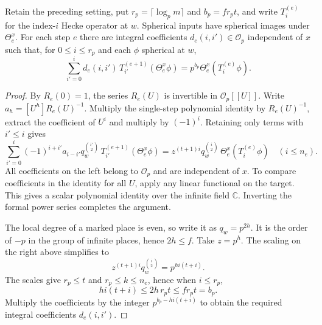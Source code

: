 \begin{lemma}
\label{lem:a-marked-hecke-one-step-cost}
\emitthmsource
Retain the preceding setting, put $r_p=\lceil\log_p m\rceil$ and $b_p=fr_pt$, and write $T_i^{(e)}$ for the index-$i$ Hecke operator at $w$. Spherical inputs have spherical images under $\Theta_e^x$. For each step $e$ there are integral coefficients $d_e(i,i')\in\mathcal O_p$ independent of $x$ such that, for $0\le i\le r_p$ and each $\phi$ spherical at $w$,
\[
 \sum_{i'=0}^{i}d_e(i,i')\,T_{i'}^{(e+1)}(\Theta_e^x\phi)
      =p^{b_p}\Theta_e^x(T_i^{(e)}\phi).
\]
\end{lemma}
\begin{proof}
By $R_e(0)=1$, the series $R_e(U)$ is invertible in $\mathcal O_p[[U]]$. Write $a_h=[U^h]R_e(U)^{-1}$. Multiply the single-step polynomial identity by $R_e(U)^{-1}$, extract the coefficient of $U^i$ and multiply by $(-1)^i$. Retaining only terms with $i'\le i$ gives
\[
 \sum_{i'=0}^{i}
    (-1)^{i+i'}a_{i-i'}q_w^{\binom{i'}2}\,T_{i'}^{(e+1)}(\Theta_e^x\phi)
  =z^{(t+1)i}q_w^{\binom i2}\,\Theta_e^x(T_i^{(e)}\phi)
 \quad (i\le n_e).
\]
All coefficients on the left belong to $\mathcal O_p$ and are independent of $x$. To compare coefficients in the identity for all $U$, apply any linear functional on the target. This gives a scalar polynomial identity over the infinite field $\mathbb C$. Inverting the formal power series completes the argument.

The local degree of a marked place is even, so write it as $q_w=p^{2h}$. It is the order of $-p$ in the group of infinite places, hence $2h\le f$. Take $z=p^h$. The scaling on the right above simplifies to
\[
 z^{(t+1)i}q_w^{\binom i2}
  =p^{h i(t+i)}.
\]
The scales give $r_p\le t$ and $r_p\le k\le n_e$, hence when $i\le r_p$,
\[
 h i(t+i)\le2h\,r_pt\le fr_pt=b_p.
\]
Multiply the coefficients by the integer $p^{b_p-h i(t+i)}$ to obtain the required integral coefficients $d_e(i,i')$.
\end{proof}

